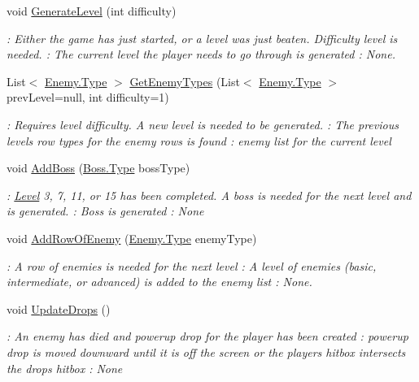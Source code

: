 \begin{DoxyCompactItemize}
\item 
void \hyperlink{classXaria_1_1Level_a22bccc0212af3ebce89ad36a735cf2f1}{Generate\+Level} (int difficulty)
\begin{DoxyCompactList}\small\item\em \+: Either the game has just started, or a level was just beaten. Difficulty level is needed. \+: The current level the player needs to go through is generated \+: None. \end{DoxyCompactList}\item 
List$<$ \hyperlink{classXaria_1_1Enemy_af736652ccf0a3aabacb41bd1afd41234}{Enemy.\+Type} $>$ \hyperlink{classXaria_1_1Level_ae564a661679ef491ffc9ec1406a34d51}{Get\+Enemy\+Types} (List$<$ \hyperlink{classXaria_1_1Enemy_af736652ccf0a3aabacb41bd1afd41234}{Enemy.\+Type} $>$ prev\+Level=null, int difficulty=1)
\begin{DoxyCompactList}\small\item\em \+: Requires level difficulty. A new level is needed to be generated. \+: The previous level\textquotesingle{}s row types for the enemy rows is found \+: enemy list for the current level \end{DoxyCompactList}\item 
void \hyperlink{classXaria_1_1Level_a29b52773008e6b0091a896718d4004b0}{Add\+Boss} (\hyperlink{classXaria_1_1Enemies_1_1Boss_ae95ffc3618433440acbfd7aab7671b02}{Boss.\+Type} boss\+Type)
\begin{DoxyCompactList}\small\item\em \+: \hyperlink{classXaria_1_1Level}{Level} 3, 7, 11, or 15 has been completed. A boss is needed for the next level and is generated. \+: Boss is generated \+: None \end{DoxyCompactList}\item 
void \hyperlink{classXaria_1_1Level_a90464cee28b51fe396f2990c15af90f3}{Add\+Row\+Of\+Enemy} (\hyperlink{classXaria_1_1Enemy_af736652ccf0a3aabacb41bd1afd41234}{Enemy.\+Type} enemy\+Type)
\begin{DoxyCompactList}\small\item\em \+: A row of enemies is needed for the next level \+: A level of enemies (basic, intermediate, or advanced) is added to the enemy list \+: None. \end{DoxyCompactList}\item 
void \hyperlink{classXaria_1_1Level_a066f8459e44939f3d2851427dfc3423e}{Update\+Drops} ()
\begin{DoxyCompactList}\small\item\em \+: An enemy has died and powerup drop for the player has been created \+: powerup drop is moved downward until it is off the screen or the player\textquotesingle{}s hitbox intersects the drops hitbox \+: None \end{DoxyCompactList}\item 

\end{DoxyCompactItemize}
